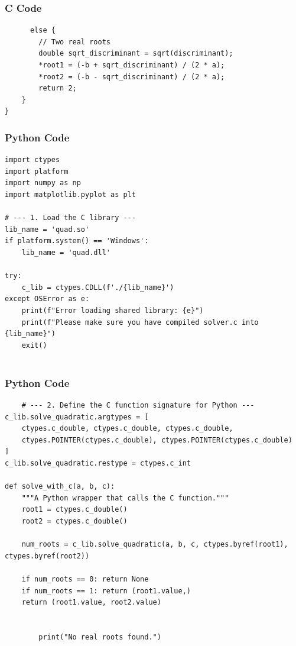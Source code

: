 \documentclass{beamer}
\begin{document}
    \begin{frame}[fragile]
        \frametitle{C Code}
        \begin{lstlisting}
      else {
        // Two real roots
        double sqrt_discriminant = sqrt(discriminant);
        *root1 = (-b + sqrt_discriminant) / (2 * a);
        *root2 = (-b - sqrt_discriminant) / (2 * a);
        return 2;
    }
}
        \end{lstlisting}
    \end{frame}
    
   
    
    \begin{frame}[fragile]
        \frametitle{Python Code}
        \begin{lstlisting}
import ctypes
import platform
import numpy as np
import matplotlib.pyplot as plt

# --- 1. Load the C library ---
lib_name = 'quad.so'
if platform.system() == 'Windows':
    lib_name = 'quad.dll'

try:
    c_lib = ctypes.CDLL(f'./{lib_name}')
except OSError as e:
    print(f"Error loading shared library: {e}")
    print(f"Please make sure you have compiled solver.c into {lib_name}")
    exit()


        \end{lstlisting}
    \end{frame}
    
    \begin{frame}[fragile]
        \frametitle{Python Code}
        \begin{lstlisting}
    # --- 2. Define the C function signature for Python ---
c_lib.solve_quadratic.argtypes = [
    ctypes.c_double, ctypes.c_double, ctypes.c_double,
    ctypes.POINTER(ctypes.c_double), ctypes.POINTER(ctypes.c_double)
]
c_lib.solve_quadratic.restype = ctypes.c_int

def solve_with_c(a, b, c):
    """A Python wrapper that calls the C function."""
    root1 = ctypes.c_double()
    root2 = ctypes.c_double()
    
    num_roots = c_lib.solve_quadratic(a, b, c, ctypes.byref(root1), ctypes.byref(root2))
    
    if num_roots == 0: return None
    if num_roots == 1: return (root1.value,)
    return (root1.value, root2.value)


        print("No real roots found.")
        \end{lstlisting}
    \end{frame}
    
\end{document}
